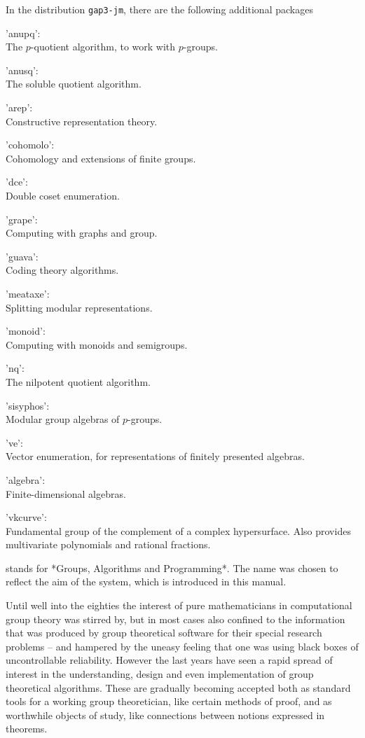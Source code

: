 In the distribution {\tt gap3-jm}, there are the following additional packages\:

'anupq':\\ The $p$-quotient algorithm, to work with $p$-groups.

'anusq':\\ The soluble quotient algorithm.

'arep':\\ Constructive representation theory.

'cohomolo':\\ Cohomology and extensions of finite groups.

'dce':\\ Double coset enumeration.

'grape':\\ Computing with graphs and group.

'guava':\\ Coding theory algorithms.

'meataxe':\\ Splitting modular representations.

'monoid':\\ Computing with monoids and semigroups.

'nq':\\ The nilpotent quotient algorithm.

'sisyphos':\\ Modular group algebras of $p$-groups.

've':\\ Vector enumeration, for representations of finitely presented
algebras.

'algebra':\\ Finite-dimensional algebras.

'vkcurve':\\ Fundamental group of the complement of a complex hypersurface.
Also provides multivariate polynomials and rational fractions.
\newpage


{\GAP} stands for *Groups,  Algorithms  and  Programming*.  The name  was
chosen to reflect the  aim of the  system,  which is  introduced in  this
manual.

Until  well into the  eighties  the  interest  of pure mathematicians  in
computational  group theory  was  stirred  by,  but in  most  cases  also
confined to  the  information  that  was  produced  by  group theoretical
software  for  their special research  problems  --  and  hampered by the
uneasy  feeling  that  one  was   using  black  boxes  of  uncontrollable
reliability.  However the last years have seen a rapid spread of interest
in the understanding, design and even implementation of group theoretical
algorithms.  These are gradually becoming accepted both as standard tools
for a working group theoretician,  like certain  methods of proof, and as
worthwhile  objects of study, like  connections between notions expressed
in theorems.

